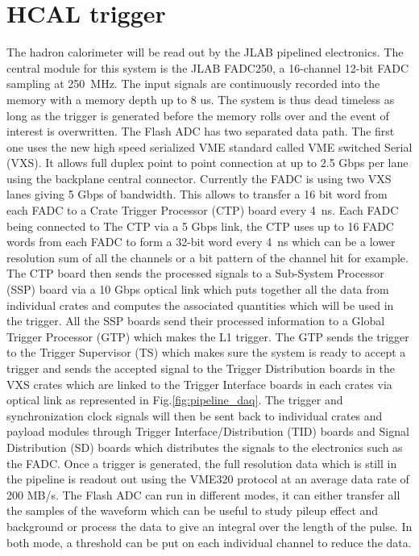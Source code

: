 \documentclass{article}
\begin{document}
 	\newpage
\section{HCAL trigger}
\label{sec:hcal-vxs}
The hadron calorimeter will be read out by the JLAB pipelined electronics.
The central module for this system is the JLAB FADC250, a 16-channel 12-bit FADC sampling at 250~MHz. The input signals are continuously recorded into the memory with a memory depth up to 8 us. The system is thus dead timeless as long as the trigger is generated before the memory rolls over and the event of interest is overwritten.
The Flash ADC has two separated data path.
The first one uses the new high speed serialized VME standard called VME switched Serial (VXS).
It allows full duplex point to point connection at up to 2.5 Gbps per lane using the backplane central connector.
Currently the FADC is using two VXS lanes giving 5 Gbps of bandwidth.
This allows to transfer a 16 bit word from each FADC to a Crate Trigger Processor (CTP) board every 4~ns.
Each FADC being connected to The CTP via a 5 Gbps link, the CTP uses up to 16 FADC words from each FADC to form a 32-bit word every 4~ns which can be a lower resolution sum of all the channels or a bit pattern of the channel hit for example.
The CTP board then sends the processed signals to a Sub-System Processor (SSP) board via a 10 Gbps optical link which puts together all the data from individual crates and computes the associated quantities which will be used in the trigger.
All the SSP boards send their processed information to a Global Trigger Processor (GTP) which makes the L1 trigger.
The GTP sends the trigger to the Trigger Supervisor (TS) which makes sure the system is ready to accept a trigger and sends the accepted signal to the Trigger Distribution boards in the VXS crates which are linked to the Trigger Interface boards in each crates via optical link as represented in Fig.\ref{fig:pipeline_daq}.
The trigger and synchronization clock signals will then be sent back to individual crates and payload modules through Trigger Interface/Distribution (TID) boards and Signal Distribution (SD) boards which distributes the signals to the electronics such as the FADC.
Once a trigger is generated, the full resolution data which is still in the pipeline is readout out using the VME320 protocol at an average data rate of 200 MB/s.
The Flash ADC can run in different modes, it can either transfer all the samples of the waveform which can be useful to study pileup effect and background or process the data to give an integral over the length of the pulse. In both mode, a threshold can be put on each individual channel to reduce the data.
\end{document}
